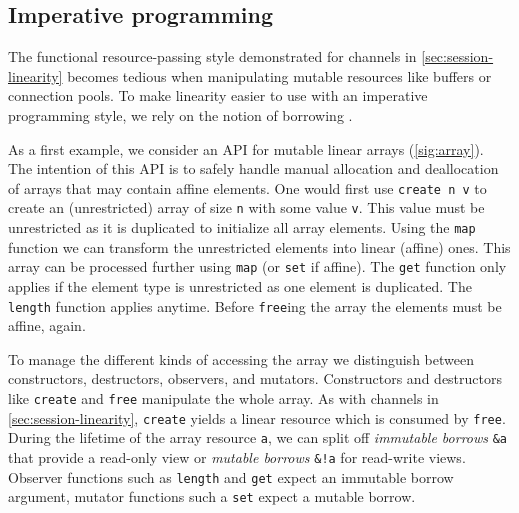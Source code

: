 
\subsection{Imperative programming}
\label{sec:imper-progr}

The functional resource-passing style demonstrated for channels in
\cref{sec:session-linearity} becomes tedious when manipulating mutable
resources like buffers or connection pools.
%
To make linearity easier to use with an imperative programming style, we rely on
the notion of borrowing \cite{DBLP:conf/popl/BoylandR05}.

As a first example, we consider an API for mutable linear arrays
(\cref{sig:array}).
The intention of this API is to safely handle manual allocation and
deallocation of arrays that may contain affine elements.
One would first use \lstinline/create n v/ to create
an (unrestricted) array of size \lstinline/n/ with some value
\lstinline/v/. This value must be unrestricted as it is duplicated to
initialize all array elements. Using the \lstinline/map/ function we
can transform the unrestricted elements into linear (affine)
ones. This array can be processed further using \lstinline/map/ (or \lstinline/set/ if
affine). The \lstinline/get/ function only applies if the element type
is unrestricted as one element is duplicated. The \lstinline/length/
function applies anytime. Before \lstinline/free/ing the array the elements must be
affine, again. 

To manage the different kinds of accessing the array we distinguish between constructors, destructors, 
observers, and mutators. 
Constructors and destructors like \lstinline/create/ and \lstinline/free/ manipulate the whole
array. As with channels in \cref{sec:session-linearity},
\lstinline/create/ yields a linear resource which is consumed by \lstinline/free/.
During the lifetime of the array resource \lstinline/a/, we can split
off \emph{immutable borrows} \lstinline/&a/ that provide a read-only
view or \emph{mutable borrows} \lstinline/&!a/ for read-write views.
Observer functions such as \lstinline/length/ and \lstinline/get/ expect an immutable borrow
argument, mutator functions such a \lstinline/set/ expect
a mutable borrow.

